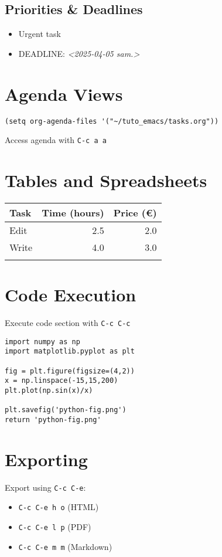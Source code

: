 \documentclass[11pt]{article}
\begin{document}
\subsection{Priorities \& Deadlines}
\label{sec:org1b38222}
\begin{itemize}
\item\relax [\#A] Urgent task
\item DEADLINE: \textit{<2025-04-05 sam.>}
\end{itemize}


\section{Agenda Views}
\label{sec:org6253fb0}
\begin{verbatim}
(setq org-agenda-files '("~/tuto_emacs/tasks.org"))
\end{verbatim}
Access agenda with \texttt{C-c a a}


\section{Tables and Spreadsheets}
\label{sec:orgca594f3}
\begin{center}
\begin{tabular}{lrr}
Task & Time (hours) & Price (€)\\
\hline
Edit & 2.5 & 2.0\\
Write & 4.0 & 3.0\\
 &  & \\
\end{tabular}
\end{center}


\section{Code Execution}
\label{sec:org36baa69}
Execute code section with \texttt{C-c C-c}
\begin{verbatim}
import numpy as np
import matplotlib.pyplot as plt

fig = plt.figure(figsize=(4,2))
x = np.linspace(-15,15,200)
plt.plot(np.sin(x)/x)

plt.savefig('python-fig.png')
return 'python-fig.png'
\end{verbatim}



\section{Exporting}
\label{sec:org033c76e}
Export using \texttt{C-c C-e}:
\begin{itemize}
\item \texttt{C-c C-e h o} (HTML)
\item \texttt{C-c C-e l p} (PDF)
\item \texttt{C-c C-e m m} (Markdown)
\end{itemize}
\end{document}

